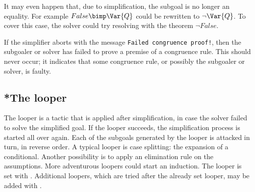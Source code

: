 It may even happen that, due to simplification, the subgoal is no longer an
equality.  For example $False \bimp \Var{Q}$ could be rewritten to
$\neg\Var{Q}$.  To cover this case, the solver could try resolving with the
theorem $\neg False$.

\begin{warn}
  If the simplifier aborts with the message {\tt Failed congruence proof!},
  then the subgoaler or solver has failed to prove a premise of a
  congruence rule.  This should never occur; it indicates that some
  congruence rule, or possibly the subgoaler or solver, is faulty.
\end{warn}


\subsection{*The looper}
The looper is a tactic that is applied after simplification, in case the
solver failed to solve the simplified goal.  If the looper succeeds, the
simplification process is started all over again.  Each of the subgoals
generated by the looper is attacked in turn, in reverse order.  A
typical looper is case splitting: the expansion of a conditional.  Another
possibility is to apply an elimination rule on the assumptions.  More
adventurous loopers could start an induction.  The looper is set with 
. Additional loopers, which are tried after the already set
looper, may be added with .


